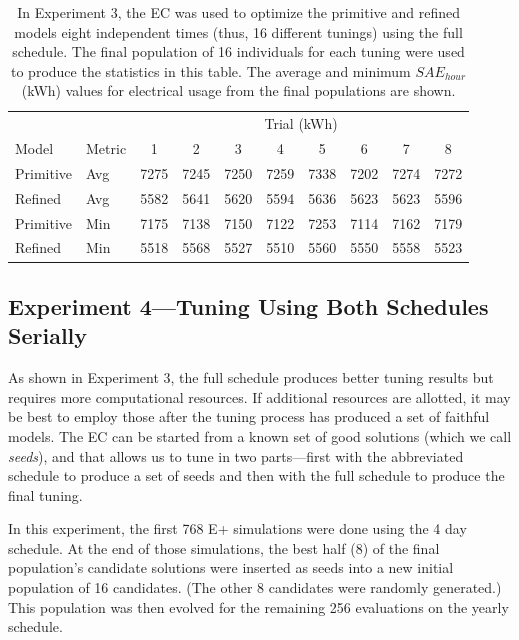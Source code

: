 \documentclass[preprint, review, 12pt]{elsarticle}
\begin{document}
{\begin{table}[htbp]
\centering
\caption{In Experiment 3, the EC was used to optimize the primitive and refined models eight independent times (thus, 16 different tunings) using the full schedule. The final population of 16 individuals for each tuning were used to produce the statistics in this table. The average and minimum $SAE_{hour}$ (kWh) values for electrical usage from the final populations are shown.}
\label{tab:hourly-full}
\begin{tabular}{llcccccccc}
\toprule
 &  & \multicolumn{8}{c}{Trial (kWh)}\\
Model & Metric & 1 & 2 & 3 & 4 & 5 & 6 & 7 & 8\\
\midrule
Primitive & Avg & 7275 & 7245 & 7250 & 7259 & 7338 & 7202 & 7274 & 7272\\\rowcolor{DarkRow}
Refined   & Avg & 5582 & 5641 & 5620 & 5594 & 5636 & 5623 & 5623 & 5596\\
Primitive & Min & 7175 & 7138 & 7150 & 7122 & 7253 & 7114 & 7162 & 7179\\\rowcolor{DarkRow}
Refined   & Min & 5518 & 5568 & 5527 & 5510 & 5560 & 5550 & 5558 & 5523\\
\bottomrule
\end{tabular}
\end{table}



\subsection{Experiment 4---Tuning Using Both Schedules Serially}
\label{sub:experiment4}
As shown in Experiment 3, the full schedule produces better tuning results but requires more computational resources. If additional resources are allotted, it may be best to employ those after the tuning process has produced a set of faithful models. The EC can be started from a known set of good solutions (which we call \emph{seeds}), and that allows us to tune in two parts---first with the abbreviated schedule to produce a set of seeds and then with the full schedule to produce the final tuning.

In this experiment, the first 768 E+ simulations were done using the 4 day schedule. At the end of those simulations, the best half (8) of the final population's candidate solutions were inserted as seeds into a new initial population of 16 candidates. (The other 8 candidates were randomly generated.) This population was then evolved for the remaining 256 evaluations on the yearly schedule.

}
\end{document}
